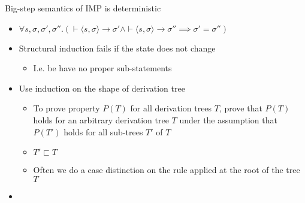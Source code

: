 \begin{itemize}
\begin{itemize}
\begin{itemize}
\begin{itemize}
                        \end{itemize}
                \end{itemize}
                \begin{itemize}
                     Big-step semantics of IMP is deterministic
                        \begin{itemize}
                            \item $\forall s, \sigma, \sigma', \sigma''. (\vdash \langle s, \sigma \rangle \to \sigma' \wedge \vdash \langle s, \sigma \rangle \to \sigma''  \implies \sigma' = \sigma'')$
                        \end{itemize}
                        \begin{itemize}
                            \item Structural induction fails if the state does not change
                                \begin{itemize}
                                    \item I.e. be have no proper sub-statements
                                \end{itemize}
                            \item Use induction on the shape of derivation tree
                                \begin{itemize}
                                    \item To prove property $P(T)$ for all derivation trees $T$, prove that $P(T)$ holds for an arbitrary derivation tree $T$ under the assumption that $P(T')$ holds for all sub-trees $T'$ of $T$
                                    \item $T' \sqsubset T$
                                    \item Often we do a case distinction on the rule applied at the root of the tree $T$
                                \end{itemize}
                        \end{itemize}
                \end{itemize}
        \end{itemize}
     
        \begin{itemize}
            \item

\end{itemize}
\end{itemize}
